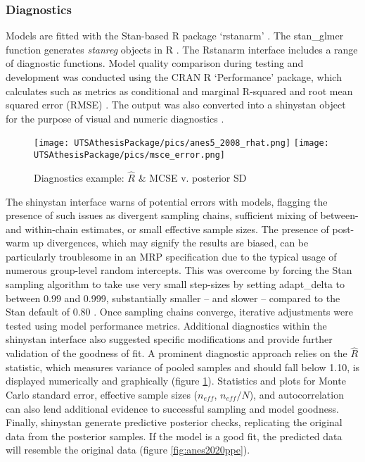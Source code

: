 \subsubsection{Diagnostics}

Models are fitted with the Stan-based R package `rstanarm' \citep{goodrich_rstanarm_2020}. The stan\_glmer function generates \textit{stanreg} objects in R \citep{r_core_team_r_2021}. The Rstanarm interface includes a range of diagnostic functions. Model quality comparison during testing and development was conducted using the CRAN R `Performance' package, which calculates such as metrics as conditional and marginal R-squared and root mean squared error (RMSE) \citep{ludecke_performance_2021}. The output was also converted into a shinystan object for the purpose of visual and numeric diagnostics \citep{gabry_shinystan_2018}.

\begin{figure}[ht]
\texttt{[image: UTSAthesisPackage/pics/anes5\_2008\_rhat.png]}
\texttt{[image: UTSAthesisPackage/pics/msce\_error.png]}
\caption{Diagnostics example: $\hat{R}$ \& MCSE v. posterior SD}
\label{fig:anesrhat2008}
\end{figure}

\noindent The shinystan interface warns of potential errors with models, flagging the presence of such issues as divergent sampling chains, sufficient mixing of between- and within-chain estimates, or small effective sample sizes. The presence of post-warm up divergences, which may signify the results are biased, can be particularly troublesome in an MRP specification due to the typical usage of numerous group-level random intercepts. This was overcome by forcing the Stan sampling algorithm to take use very small step-sizes by setting adapt\_delta to between 0.99 and 0.999, substantially smaller -- and slower -- compared to the Stan default of 0.80 \citep{stan_development_team_stan_2021}. Once sampling chains converge, iterative adjustments were tested using model performance metrics. Additional diagnostics within the shinystan interface also suggested specific modifications and provide further validation of the goodness of fit. A prominent diagnostic approach relies on the $\hat{R}$ statistic, which measures variance of pooled samples and should fall below 1.10, is displayed numerically and graphically (figure \ref{fig:anesrhat2008}). Statistics and plots for Monte Carlo standard error, effective sample sizes ($n_{eff}$, $n_{eff} / N$), and autocorrelation can also lend additional evidence to successful sampling and model goodness. Finally, shinystan generate predictive posterior checks, replicating the original data from the posterior samples. If the model is a good fit, the predicted data will resemble the original data (figure \ref{fig:anes2020ppe}). 

